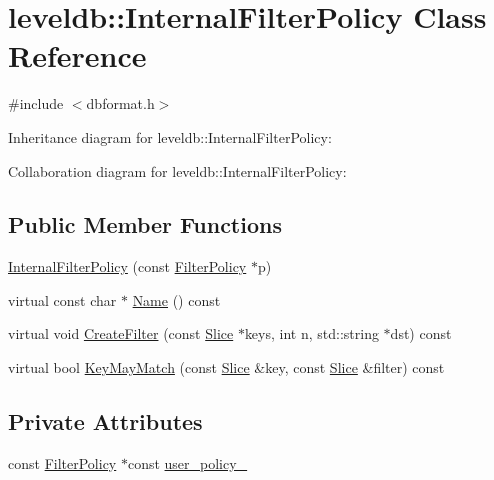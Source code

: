 \hypertarget{classleveldb_1_1_internal_filter_policy}{\section{leveldb\-:\-:Internal\-Filter\-Policy Class Reference}
\label{classleveldb_1_1_internal_filter_policy}
}


{\ttfamily \#include $<$dbformat.\-h$>$}



Inheritance diagram for leveldb\-:\-:Internal\-Filter\-Policy\-:


Collaboration diagram for leveldb\-:\-:Internal\-Filter\-Policy\-:
\subsection*{Public Member Functions}
\begin{DoxyCompactItemize}
\item 
\hyperlink{classleveldb_1_1_internal_filter_policy_a55469eb6ea941243cd1c65eb14bd8978}{Internal\-Filter\-Policy} (const \hyperlink{classleveldb_1_1_filter_policy}{Filter\-Policy} $\ast$p)
\item 
virtual const char $\ast$ \hyperlink{classleveldb_1_1_internal_filter_policy_ab7f6002d74ba6a2838e1fc826e2095fc}{Name} () const 
\item 
virtual void \hyperlink{classleveldb_1_1_internal_filter_policy_a1c7c7b7eecdfb872e35708793d82ab40}{Create\-Filter} (const \hyperlink{classleveldb_1_1_slice}{Slice} $\ast$keys, int n, std\-::string $\ast$dst) const 
\item 
virtual bool \hyperlink{classleveldb_1_1_internal_filter_policy_a42dc5124aa139c68bec2efa7417a7373}{Key\-May\-Match} (const \hyperlink{classleveldb_1_1_slice}{Slice} \&key, const \hyperlink{classleveldb_1_1_slice}{Slice} \&filter) const 
\end{DoxyCompactItemize}
\subsection*{Private Attributes}
\begin{DoxyCompactItemize}
\item 
const \hyperlink{classleveldb_1_1_filter_policy}{Filter\-Policy} $\ast$const \hyperlink{classleveldb_1_1_internal_filter_policy_ab8fddd1a2c3c5325e92d6e19ee024f62}{user\-\_\-policy\-\_\-}
\end{DoxyCompactItemize}



